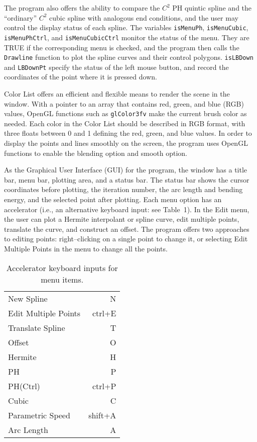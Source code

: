 \documentclass[12pt]{article}
\begin{document}
The program also offers the ability to compare the $C^2$ PH quintic 
spline and the ``ordinary'' $C^2$ cubic spline with analogous end 
conditions, and the user may control the display status of each spline. 
The variables {\tt isMenuPh}, {\tt isMenuCubic}, {\tt isMenuPhCtrl}, and 
{\tt isMenuCubicCtrl} monitor the status of the menu. They are TRUE if the 
corresponding menu is checked, and the program then calls the {\tt Drawline} 
function to plot the spline curves and their control polygons. {\tt isLBDown} 
and {\tt LBDownPt} specify the status of the left mouse button, and record 
the coordinates of the point where it is pressed down.

Color List offers an efficient and flexible means to render the scene 
in the window. With a pointer to an array that contains red, green, and
blue (RGB) values, OpenGL functions such as {\tt glColor3fv} make the 
current brush color as needed. Each color in the Color List should be 
described in RGB format, with three floats between 0 and 1 defining the 
red, green, and blue values. In order to display the points and lines 
smoothly on the screen, the program uses OpenGL functions to enable the 
blending option and smooth option.

As the Graphical User Interface (GUI) for the program, the window has a 
title bar, menu bar, plotting area, and a status bar. The status bar shows 
the cursor coordinates before plotting, the iteration number, the arc 
length and bending energy, and the selected point after plotting. Each
menu option has an accelerator (i.e., an alternative keyboard input:
see Table~1). In the Edit menu, the user can plot a Hermite interpolant or 
spline curve, edit multiple points, translate the curve, and construct an 
offset. The program offers two approaches to editing points: right--clicking 
on a single point to change it, or selecting Edit Multiple Points in the 
menu to change all the points. 

\begin{table}[h]
\centering
\begin{tabular}{|l|r|}
\hline
New Spline & N \\
Edit Multiple Points & ctrl+E \\
Translate Spline & T \\
Offset & O \\
Hermite & H \\
PH & P \\
PH(Ctrl) & ctrl+P \\
Cubic & C \\
Parametric Speed & shift+A \\
Arc Length & A \\
\hline
\end{tabular}
\caption{Accelerator keyboard inputs for menu items.}
\end{table} 
\end{document}
